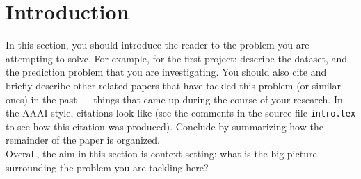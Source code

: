 
\section{Introduction}
\label{sec:intro}

In this section, you should introduce the reader to the problem you
are attempting to solve. For example, for the first project: describe
the dataset, and the prediction problem that you are
investigating. You should also cite and briefly describe other related
papers that have tackled this problem (or similar ones) in the past
--- things that came up during the course of your research. In the
AAAI style, citations look like \cite{aima} (see
the comments in the source file \texttt{intro.tex} to see how this
citation was produced). Conclude by summarizing how the
remainder of the paper is organized. \\


Overall, the aim in this section is context-setting: what is the
big-picture surrounding the problem you are tackling here?

